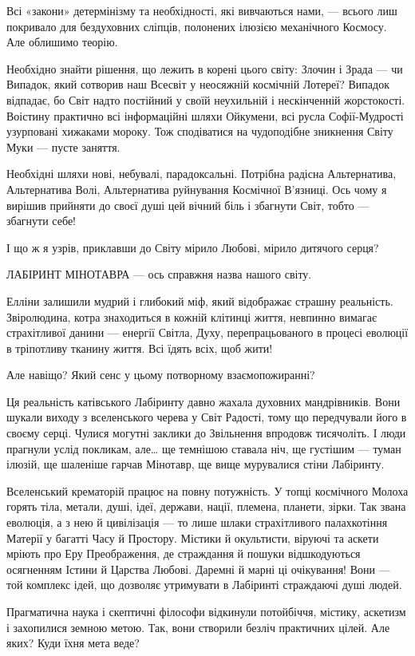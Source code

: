 Всі «закони» детермінізму та необхідності, які вивчаються нами, — всього лиш
покривало для бездуховних сліпців, полонених ілюзією механічного Космосу. Але
облишимо теорію.

Необхідно знайти рішення, що лежить в корені цього світу: Злочин і Зрада — чи
Випадок, який сотворив наш Всесвіт у неосяжній космічній Лотереї? Випадок
відпадає, бо Світ надто постійний у своїй неухильній і нескінченній
жорстокості. Воістину практично всі інформаційні шляхи Ойкумени, всі русла
Софії-Мудрості узурповані хижаками мороку. Тож сподіватися на чудоподібне
зникнення Світу Муки — пусте заняття.

Необхідні шляхи нові, небувалі, парадоксальні. Потрібна радісна Альтернатива,
Альтернатива Волі, Альтернатива руйнування Космічної В’язниці. Ось чому я
вирішив прийняти до своєї душі цей вічний біль і збагнути Світ, тобто —
збагнути себе!

І що ж я узрів, приклавши до Світу мірило Любові, мірило дитячого серця?

ЛАБІРИНТ МІНОТАВРА — ось справжня назва нашого світу.

Елліни залишили мудрий і глибокий міф, який відображає страшну реальність.
Звіролюдина, котра знаходиться в кожній клітинці життя, невпинно вимагає
страхітливої данини — енергії Світла, Духу, перепрацьованого в процесі еволюції
в тріпотливу тканину життя. Всі їдять всіх, щоб жити!

Але навіщо? Який сенс у цьому потворному взаємопожиранні?

Ця реальність катівського Лабіринту давно жахала духовних мандрівників. Вони
шукали виходу з вселенського черева у Світ Радості, тому що передчували його в
своєму серці. Чулися могутні заклики до Звільнення впродовж тисячоліть. І люди
прагнули услід покликам, але… ще темнішою ставала ніч, ще густішим — туман
ілюзій, ще шаленіше гарчав Мінотавр, ще вище мурувалися стіни Лабіринту.

Вселенський крематорій працює на повну потужність. У топці космічного Молоха
горять тіла, метали, душі, ідеї, держави, нації, племена, планети, зірки. Так
звана еволюція, а з нею й цивілізація — то лише шлаки страхітливого
палахкотіння Матерії у багатті Часу й Простору. Містики й окультисти, віруючі
та аскети мріють про Еру Преображення, де страждання й пошуки відшкодуються
осягненням Істини й Царства Любові. Даремні й марні ці очікування! Вони — той
комплекс ідей, що дозволяє утримувати в Лабіринті страждаючі душі людей.

Прагматична наука і скептичні філософи відкинули потойбіччя, містику, аскетизм
і захопилися земною метою. Так, вони створили безліч практичних цілей. Але
яких? Куди їхня мета веде?

